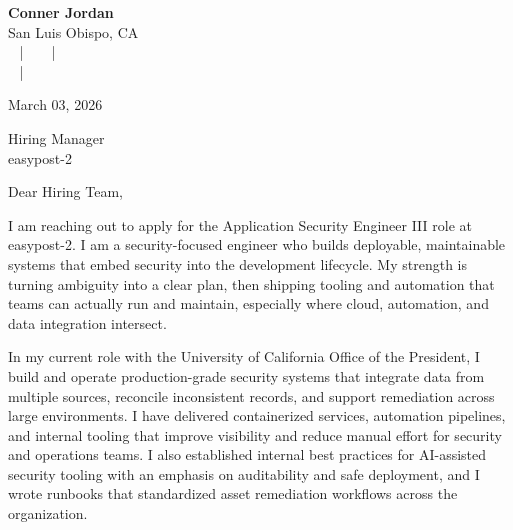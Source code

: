\documentclass[letterpaper,11pt]{article}
\newcommand{\companyname}{easypost-2}
\begin{document}
\begin{center}
  {\Huge \textbf{Conner Jordan}}\\[4pt]
  {\Large San Luis Obispo, CA}\\[4pt]
  \href{tel:+18059759793}{
    } ~ | ~
  \href{mailto:connercharlesjordan@gmail.com}{
    } ~ | ~
   \\
  \href{https://www.linkedin.com/in/conner-jordan-4b268514a/}{
    } ~ | ~
  \href{https://github.com/cjordan223}{
    }
\end{center}

\vspace{16pt}

\begin{flushright}
March 03, 2026
\end{flushright}

Hiring Manager\\
\companyname

\vspace{26pt}

\noindent
Dear Hiring Team,

\vspace{16pt}

I am reaching out to apply for the Application Security Engineer III role at \companyname. I am a security-focused engineer who builds deployable, maintainable systems that embed security into the development lifecycle. My strength is turning ambiguity into a clear plan, then shipping tooling and automation that teams can actually run and maintain, especially where cloud, automation, and data integration intersect.

\vspace{16pt}

In my current role with the University of California Office of the President, I build and operate production-grade security systems that integrate data from multiple sources, reconcile inconsistent records, and support remediation across large environments. I have delivered containerized services, automation pipelines, and internal tooling that improve visibility and reduce manual effort for security and operations teams. I also established internal best practices for AI-assisted security tooling with an emphasis on auditability and safe deployment, and I wrote runbooks that standardized asset remediation workflows across the organization.
\end{document}
